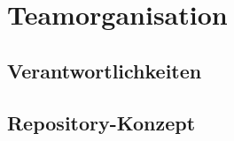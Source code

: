 \chapter{Teamorganisation}\label{ch:teamorganisation}



\section{Verantwortlichkeiten}\label{sec:verantwortlichkeiten}



\section{Repository-Konzept}\label{sec:repository-konzept}

